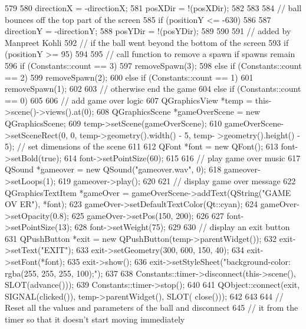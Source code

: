 \begin{DoxyCode}
{579     {
580         directionX = -directionX;
581         posXDir = !(posXDir);
582     }
583 
584     // ball bounces off the top part of the screen
585     if (positionY <= -630)
586     {
587         directionY = -directionY;
588         posYDir = !(posYDir);
589     }
590 
591     // added by Manpreet Kohli
592     // if the ball went beyond the bottom of the screen
593     if (positionY >= 95)
594     {
595         // call function to remove a spawn if spawns remain
596         if (Constants::count == 3)
597             removeSpawn(3);
598         else if (Constants::count == 2)
599             removeSpawn(2);
600         else if (Constants::count == 1)
601             removeSpawn(1);
602 
603         // otherwise end the game
604         else if (Constants::count == 0)
605         {
606             // add game over logic
607             QGraphicsView *temp  = this->scene()->views().at(0);
608             QGraphicsScene *gameOverScene = new QGraphicsScene;
609             temp->setScene(gameOverScene);
610             gameOverScene->setSceneRect(0, 0, temp->geometry().width() - 5, temp-
      >geometry().height() - 5);       // set dimensions of the scene
611 
612             QFont *font = new QFont();
613             font->setBold(true);
614             font->setPointSize(60);
615 
616             // play game over music
617             QSound *gameover = new QSound("gameover.wav", 0);
618             gameover->setLoops(1);
619             gameover->play();
620 
621             // display game over message
622             QGraphicsTextItem *gameOver = gameOverScene->addText(QString("GAME OV
      ER"), *font);
623             gameOver->setDefaultTextColor(Qt::cyan);
624             gameOver->setOpacity(0.8);
625             gameOver->setPos(150, 200);
626 
627             font->setPointSize(13);
628             font->setWeight(75);
629 
630             // display an exit button
631             QPushButton *exit = new QPushButton(temp->parentWidget());
632             exit->setText("EXIT");
633             exit->setGeometry(300, 600, 150, 40);
634             exit->setFont(*font);
635             exit->show();
636             exit->setStyleSheet("background-color: rgba(255, 255, 255, 100);");
637 
638             Constants::timer->disconnect(this->scene(), SLOT(advance()));
639             Constants::timer->stop();
640 
641             QObject::connect(exit, SIGNAL(clicked()), temp->parentWidget(), SLOT(
      close()));
642         }
643 
644         // Reset all the values and parameters of the ball and disconnect
645         // it from the timer so that it doesn't start moving immediately
}}
\end{DoxyCode}
